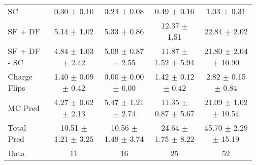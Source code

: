\begin{tabular}{l|cccc}
                                 SC &  0.30 $\pm$  0.10 &  0.24 $\pm$  0.08 &  0.49 $\pm$  0.16 &  1.03 $\pm$  0.31 \\
                            SF + DF &  5.14 $\pm$  1.02 &  5.33 $\pm$  0.86 & 12.37 $\pm$  1.51 & 22.84 $\pm$  2.02 \\
\hline
                       SF + DF - SC &  4.84 $\pm$  1.03 $\pm$  2.42 &  5.09 $\pm$  0.87 $\pm$  2.55 & 11.87 $\pm$  1.52 $\pm$  5.94 & 21.80 $\pm$  2.04 $\pm$ 10.90 \\
\hline\hline
                       Charge Flips &  1.40 $\pm$  0.09 $\pm$  0.42 &  0.00 $\pm$  0.00 $\pm$  0.00 &  1.42 $\pm$  0.12 $\pm$  0.42 &  2.82 $\pm$  0.15 $\pm$  0.84 \\
\hline
                            MC Pred &  4.27 $\pm$  0.62 $\pm$  2.13 &  5.47 $\pm$  1.21 $\pm$  2.74 & 11.35 $\pm$  0.87 $\pm$  5.67 & 21.09 $\pm$  1.02 $\pm$ 10.54 \\
\hline
                         Total Pred & 10.51 $\pm$  1.21 $\pm$  3.25 & 10.56 $\pm$  1.49 $\pm$  3.74 & 24.64 $\pm$  1.75 $\pm$  8.22 & 45.70 $\pm$  2.29 $\pm$ 15.19 \\
\hline\hline
                               Data &    11 &    16 &    25 &    52 \\
\hline\hline
\end{tabular}

